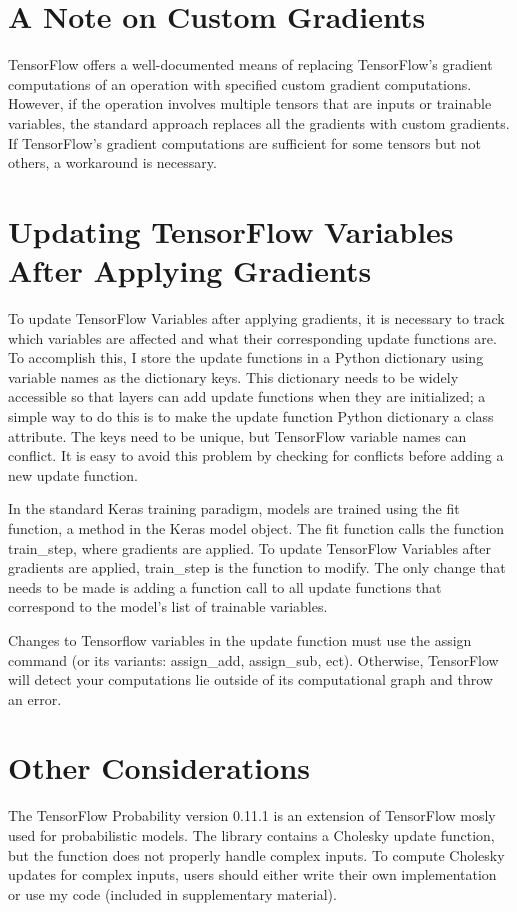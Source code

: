 \section{A Note on Custom Gradients}
TensorFlow offers a well-documented means of replacing TensorFlow's gradient computations of an operation with specified custom gradient computations. However, if the operation involves multiple tensors that are inputs or trainable variables, the standard approach replaces all the gradients with custom gradients. If TensorFlow's gradient computations are sufficient for some tensors but not others, a workaround is necessary. 

\section{Updating TensorFlow Variables After Applying Gradients}
To update TensorFlow Variables after applying gradients, it is necessary to track which variables are affected and what their corresponding update functions are. To accomplish this, I store the update functions in a Python dictionary using variable names as the dictionary keys. This dictionary needs to be widely accessible so that layers can add update functions when they are initialized; a simple way to do this is to make the update function Python dictionary a class attribute. The keys need to be unique, but TensorFlow variable names can conflict. It is easy to avoid this problem by checking for conflicts before adding a new update function.

In the standard Keras training paradigm, models are trained using the fit function, a method in the Keras model object. The fit function calls the function train\_step, where gradients are applied.  To update TensorFlow Variables after gradients are applied, train\_step is the function to modify. The only change that needs to be made is adding a function call to all update functions that correspond to the model's list of trainable variables.

Changes to Tensorflow variables in the update function must use the assign command (or its variants: assign\_add, assign\_sub, ect). Otherwise, TensorFlow will detect your computations lie outside of its computational graph and throw an error.

\section{Other Considerations}
The TensorFlow Probability version 0.11.1 \cite{tensorflowprobability} is an extension of TensorFlow mosly used for probabilistic models. The library contains a Cholesky update function, but the function does not properly handle complex inputs. To compute Cholesky updates for complex inputs, users should either write their own implementation or use my code (included in supplementary material).
